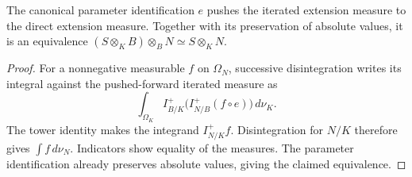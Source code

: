 \begin{lemma}\label{lem:algebraic-tower-equivalence}
\leanok
{}
The canonical parameter identification $e$ pushes the iterated
extension measure to the direct extension measure. Together with
its preservation of absolute values, it is an equivalence
$(S\otimes_KB)\otimes_BN\simeq S\otimes_KN$.
\end{lemma}
\begin{proof}
For a nonnegative measurable $f$ on $\Omega_N$, successive
disintegration writes its integral against the pushed-forward
iterated measure as
\[
 \int_{\Omega_K} I^+_{B/K}
       \bigl(I^+_{N/B}(f\circ e)\bigr)\,d\nu_K.
\]
The tower identity makes the integrand $I^+_{N/K}f$.
Disintegration for $N/K$ therefore gives $\int f\,d\nu_N$.
Indicators show equality of the measures. The parameter
identification already preserves absolute values, giving the
claimed equivalence.
\end{proof}

